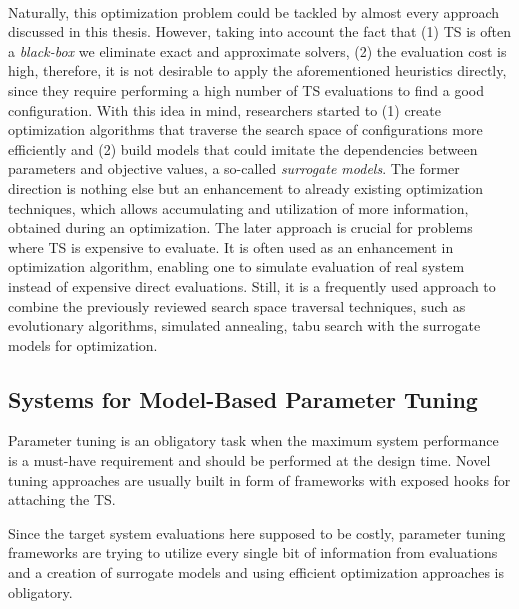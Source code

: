 \paragraph{} Naturally, this optimization problem could be tackled by almost every approach discussed in this thesis. However, taking into account the fact that (1) TS is often a \textit{black-box} we eliminate exact and approximate solvers, (2) the evaluation cost is high, therefore, it is not desirable to apply the aforementioned heuristics directly, since they require performing a high number of TS evaluations to find a good configuration. With this idea in mind, researchers started to (1) create optimization algorithms that traverse the search space of configurations more efficiently and (2) build models that could imitate the dependencies between parameters and objective values, a so-called \textit{surrogate models}. The former direction is nothing else but an enhancement to already existing optimization techniques, which allows accumulating and utilization of more information, obtained during an optimization. The later approach is crucial for problems where TS is expensive to evaluate.
It is often used as an enhancement in optimization algorithm, enabling one to simulate evaluation of real system instead of expensive direct evaluations. Still, it is a frequently used approach to combine the previously reviewed search space traversal techniques, such as evolutionary algorithms, simulated annealing, tabu search with the surrogate models for optimization.


\subsection{Systems for Model-Based Parameter Tuning}\label{bg: parameter tuning expamples}
Parameter tuning is an obligatory task when the maximum system performance is a must-have requirement and should be performed at the design time.
Novel tuning approaches are usually built in form of frameworks with exposed hooks for attaching the TS.

Since the target system evaluations here supposed to be costly, parameter tuning frameworks are trying to utilize every single bit of information from evaluations and a creation of surrogate models and using efficient optimization approaches is obligatory.

